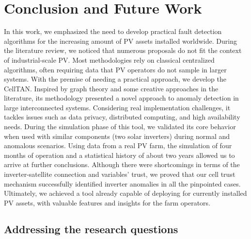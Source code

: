 \chapter{Conclusion and Future Work} \label{chap:concl}

In this work, we emphasized the need to develop practical fault detection algorithms for the increasing amount of PV assets installed worldwide. During the literature review, we noticed that numerous proposals do not fit the context of industrial-scale PV. Most methodologies rely on classical centralized algorithms, often requiring data that PV operators do not sample in larger systems.
With the premise of needing a practical approach, we develop the CellTAN. Inspired by graph theory and some creative approaches in the literature, its methodology presented a novel approach to anomaly detection in large interconnected systems. Considering real implementation challenges, it tackles issues such as data privacy, distributed computing, and high availability needs.
During the simulation phase of this tool, we validated its core behavior when used with similar components (two solar inverters) during normal and anomalous scenarios. Using data from a real PV farm, the simulation of four months of operation and a statistical history of about two years allowed us to arrive at further conclusions. Although there were shortcomings in terms of the inverter-satellite connection and variables' trust, we proved that our cell trust mechanism successfully identified inverter anomalies in all the pinpointed cases. Ultimately, we achieved a tool already capable of deploying for currently installed PV assets, with valuable features and insights for the farm operators.

\section{Addressing the research questions}


